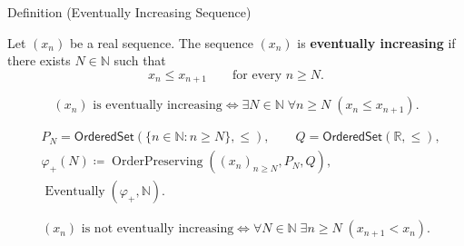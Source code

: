 
\begin{definitionbox}{Definition (Eventually Increasing Sequence)}
\begin{definition}
\label{def:eventually-increasing-sequence}
Let $(x_n)$ be a real sequence. The sequence $(x_n)$ is
\textbf{eventually increasing} if there exists $N\in\mathbb{N}$ such that
\[
  x_n \le x_{n+1}
  \qquad
  \text{for every } n\ge N.
\]
\end{definition}
\end{definitionbox}

\begin{remark*}
\[
(x_n)\text{ is eventually increasing}
\Longleftrightarrow
\exists N\in\mathbb{N}\;\forall n\ge N\;(x_n\le x_{n+1}).
\]
\end{remark*}

\begin{remark*}
\[
\begin{aligned}
&P_N=\mathsf{OrderedSet}(\{n\in\mathbb{N}:n\ge N\},\leq),\qquad
Q=\mathsf{OrderedSet}(\mathbb{R},\leq),\\
&\varphi_{+}(N)\coloneqq
\operatorname{OrderPreserving}((x_n)_{n\ge N},P_N,Q),\\
&\operatorname{Eventually}(\varphi_{+},\mathbb{N}).
\end{aligned}
\]
\end{remark*}

\begin{remark*}
\[
(x_n)\text{ is not eventually increasing}
\Longleftrightarrow
\forall N\in\mathbb{N}\;\exists n\ge N\;(x_{n+1}<x_n).
\]
\end{remark*}

